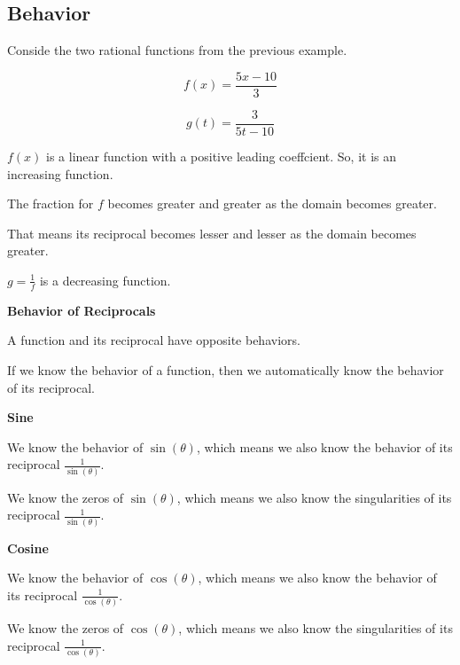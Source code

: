 \documentclass{ximera}
\begin{document}
\subsection*{Behavior}



Conside the two rational functions from the previous example.


\[
f(x) = \frac{5x - 10}{3}
\]




\[
g(t) = \frac{3}{5t - 10}
\]



$f(x)$ is a linear function with a positive leading coeffcient.  So, it is an increasing function. 


The fraction for $f$ becomes greater and greater as the domain becomes greater. 

That means its reciprocal becomes lesser and lesser as the domain becomes greater. 

$g = \frac{1}{f}$ is a decreasing function.




\begin{fact}  \textbf{\textcolor{red!75!green}{Behavior of Reciprocals}} 

A function and its reciprocal have opposite behaviors.


\end{fact}

If we know the behavior of a function, then we automatically know the behavior of its reciprocal. 





\textbf{\textcolor{purple!80!black}{Sine}} 

We know the behavior of $\sin(\theta)$, which means we also know the behavior of its reciprocal $\frac{1}{\sin(\theta)}$. 


We know the zeros of $\sin(\theta)$, which means we also know the singularities of its reciprocal $\frac{1}{\sin(\theta)}$. 







\textbf{\textcolor{purple!80!black}{Cosine}} 

We know the behavior of $\cos(\theta)$, which means we also know the behavior of its reciprocal $\frac{1}{\cos(\theta)}$. 


We know the zeros of $\cos(\theta)$, which means we also know the singularities of its reciprocal $\frac{1}{\cos(\theta)}$. 
\end{document}
